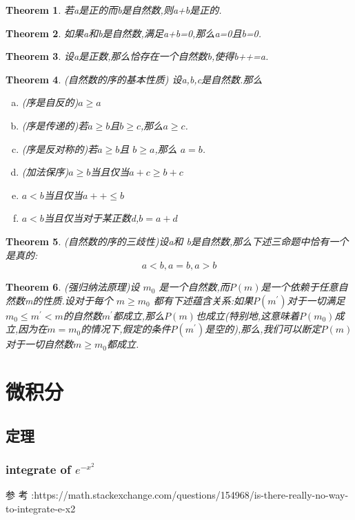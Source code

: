 \documentclass[UTF-8]{ctexart}
\newtheorem{theorem}{Theorem}[section]
\begin{document}
\begin{theorem}
若a是正的而b是自然数,则a+b是正的.
\end{theorem}

\begin{theorem}
如果a和b是自然数,满足a+b=0,那么a=0且b=0.
\end{theorem}

\begin{theorem}
设a是正数,那么恰存在一个自然数b,使得b++=a.
\end{theorem}

\begin{theorem}
  (自然数的序的基本性质) 设a,b,c是自然数.那么
\begin{enumerate}[(a)]
\item (序是自反的)$a\geq a$
\item (序是传递的)若$a \geq b$且$b \geq c$,那么$a \geq c$.
\item (序是反对称的)若$a \geq b$且 $b \geq a$,那么 $a = b$.
\item (加法保序)$a \geq b$当且仅当$a+c \geq b+c$
\item $a < b $当且仅当$a++ \leq b$
\item $a < b $当且仅当对于某正数d,$b=a+d$
\end{enumerate}
\end{theorem}

\begin{theorem}
  (自然数的序的三歧性)设a和
  b是自然数,那么下述三命题中恰有一个是真的:
  $$a<b,a=b,a>b$$
\end{theorem}

\begin{theorem}
(强归纳法原理)设 $m_0$ 是一个自然数,而$P(m)$是一个依赖于任意自然数m的性质.设对于每个 $m \geq m_0$ 都有下述蕴含关系:如果$P(m^{'})$对于一切满足$m_0 \leq m^{'}  < m$的自然数$m^{'}$都成立,那么$P(m)$也成立(特别地,这意味着$P(m_0)$成立,因为在$m=m_0$的情况下,假定的条件$P(m^{'})$是空的),那么,我们可以断定$P(m)$对于一切自然数$m \geq m_0$都成立.

\end{theorem}

\newpage
\section{微积分}
\subsection{定理}
\subsubsection{integrate of $e^{-x^2}$}
参
考
:https://math.stackexchange.com/questions/154968/is-there-really-no-way-to-integrate-e-x2
\end{document}
